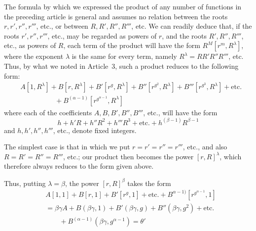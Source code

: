The formula by which we expressed the product of any number of functions in the preceding article is general and assumes no relation between the roots $r,r',r'',r'''$, etc., or between $R,R',R'',R'''$, etc. We can readily deduce that, if the roots $r',r'',r'''$, etc., may be regarded as powers of $r$, and the roots $R',R'',R'''$, etc., as powers of $R$, each term of the product will have the form $R^M[r^m,R^\lambda]$, where the exponent $\lambda$ is the same for every term, namely $R^\lambda=RR'R''R'''$, etc. Thus, by what we noted in Article~3, such a product reduces to the following form:
\[
\begin{aligned}
&A[1,R^\lambda]+B[r,R^\lambda]+B'[r^g,R^\lambda]+B''[r^{g^2},R^\lambda]+B'''[r^{g^3},R^\lambda]+\text{etc.}\\
&\hspace{5em}{}+B^{(\alpha-1)}[r^{g^{\alpha-1}},R^\lambda]
\end{aligned}
\]
where each of the coefficients $A,B,B',B'',B'''$, etc., will have the form
\[
h+h'R+h''R^2+h'''R^3+\text{etc.}+h^{(\beta-1)}R^{\beta-1}
\]
and $h,h',h'',h'''$, etc., denote fixed integers.

The simplest case is that in which we put $r=r'=r''=r'''$, etc., and also $R=R'=R''=R'''$, etc.; our product then becomes the power $[r,R]^\lambda$, which therefore always reduces to the form given above.

Thus, putting $\lambda=\beta$, the power $[r,R]^\beta$ takes the form
\[
\begin{aligned}
&A[1,1]+B[r,1]+B'[r^g,1]+\text{etc.}+B^{\alpha-1)}[r^{g^{\alpha-1}},1]\\
&{}=\beta\gamma A+B(\beta\gamma,1)+B'(\beta\gamma,g)+B''(\beta\gamma,g^2)+\text{etc.}\\
&\qquad{}+B^{(\alpha-1)}(\beta\gamma,g^{\alpha-1})=\theta'
\end{aligned}
\]

